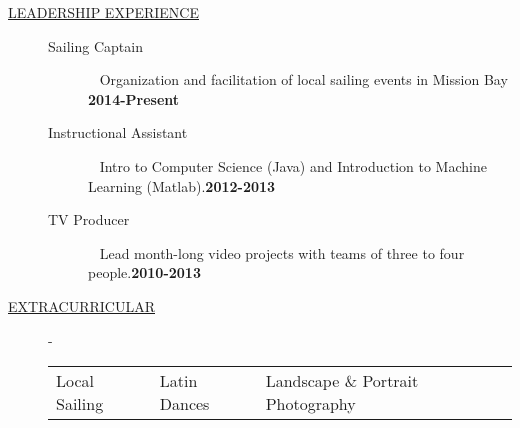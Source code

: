 \documentclass{article}
\begin{document}
\begin{description}
    \item[\underline{LEADERSHIP EXPERIENCE}] \hfill
        \begin{description} 
            \item[Sailing Captain] \textbullet ~ Organization and facilitation of local sailing events in Mission Bay \hfill \textbf{2014-Present}\\
            \item[Instructional Assistant] 
                \textbullet ~ Intro to Computer Science (Java) and Introduction to Machine Learning (Matlab).\hfill \textbf{2012-2013}\\
            \item[TV Producer] \textbullet ~ Lead month-long video projects with teams of three to four people.\hfill \textbf{2010-2013}\\
        \end{description}

    \item[\underline{EXTRACURRICULAR}] -
        \begin{tabular}{l|l|l}
            Local Sailing & Latin Dances & Landscape \& Portrait Photography
        \end{tabular}
	
\end{description}
\end{document}
